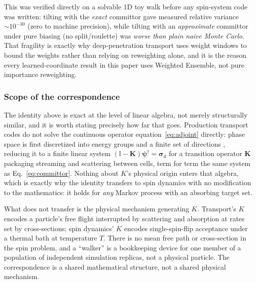 \documentclass[a4paper,fleqn]{cas-sc}
\newcommand{\dg}{^{\dagger}}
\begin{document}
This was verified directly on a solvable 1D toy walk before any spin-system code was
written: tilting with the \emph{exact} committor gave measured relative variance
$\sim\!10^{-30}$ (zero to machine precision), while tilting with an \emph{approximate}
committor under pure biasing (no split/roulette) was \emph{worse than plain naive Monte
	Carlo}. That fragility is exactly why deep-penetration transport uses weight windows to
bound the weights rather than relying on reweighting alone, and it is the reason every
learned-coordinate result in this paper uses Weighted Ensemble, not pure importance
reweighting.

\subsubsection{Scope of the correspondence}\label{sec:scope}
The identity above is exact at the level of linear algebra, not merely structurally
similar, and it is worth stating precisely how far that goes. Production transport codes
do not solve the continuous operator equation~\eqref{eq:adjoint} directly: phase space is
first discretized into energy groups and a finite set of directions
\cite{wagner1998, lewins1965}, reducing it to a finite linear system
$(\mathbb I-\mathbf K)\boldsymbol\psi\dg=\boldsymbol\sigma_d$ for a transition operator
$\mathbf K$ packaging streaming and scattering between cells, term for term the same
system as Eq.~\eqref{eq:committor}. Nothing about $K$'s physical origin enters that algebra,
which is exactly why the identity transfers to spin dynamics with no modification to the
mathematics: it holds for \emph{any} Markov process with an absorbing target set.

What does not transfer is the physical mechanism generating $K$. Transport's $K$ encodes a
particle's free flight interrupted by scattering and absorption at rates set by
cross-sections; spin dynamics' $K$ encodes single-spin-flip acceptance under a thermal bath
at temperature $T$. There is no mean free path or cross-section in the spin problem, and a
``walker'' is a bookkeeping device for one member of a population of independent
simulation replicas, not a physical particle. The correspondence is a shared
mathematical structure, not a shared physical mechanism.
\end{document}
